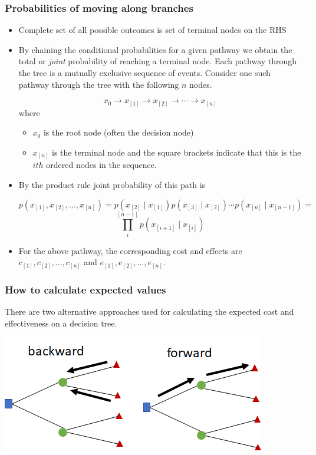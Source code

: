 \begin{frame}
\frametitle{Probabilities of moving along branches}

\begin{itemize}
 \item Complete set of all possible outcomes is set of terminal nodes on the RHS
\pause
 \item By chaining the conditional probabilities for a given pathway we obtain the total or
\emph{joint} probability of reaching a terminal node. Each pathway
through the tree is a mutually exclusive sequence of events. Consider
one such pathway through the tree with the following \(n\) nodes.

\[
x_0 \rightarrow x_{[1]} \rightarrow x_{[2]} \rightarrow \cdots \rightarrow x_{[n]}
\]
where 
\begin{itemize}
\item \(x_0\) is the root node (often the decision node)
\item \(x_{[n]}\) is the terminal node and the square brackets indicate that this is the \(ith\) ordered nodes in the sequence.
\end{itemize}
\pause
 \item By the product rule joint probability of this path is

\[
p(x_{[1]}, x_{[2]}, \ldots, x_{[n]}) =
p(x_{[2]} \mid x_{[1]}) p(x_{[3]} \mid x_{[2]}) \cdots  p(x_{[n]} \mid x_{[n - 1]}) =
\]
\[
\prod_i^{[n - 1]} p(x_{[i + 1]} \mid x_{[i]})
\]
\pause
 \item For the above pathway, the corresponding cost and effects are
\(c_{[1]}, c_{[2]}, \ldots, c_{[n]}\) and
\(e_{[1]}, e_{[2]}, \ldots, e_{[n]}\).
\end{itemize}

\end{frame}

\begin{frame}
\frametitle{How to calculate expected values}

There are two alternative approaches used for calculating the expected
cost and effectiveness on a decision tree.

\includegraphics{decision-trees/figs/forward-backward-diagram.png}

\end{frame}

